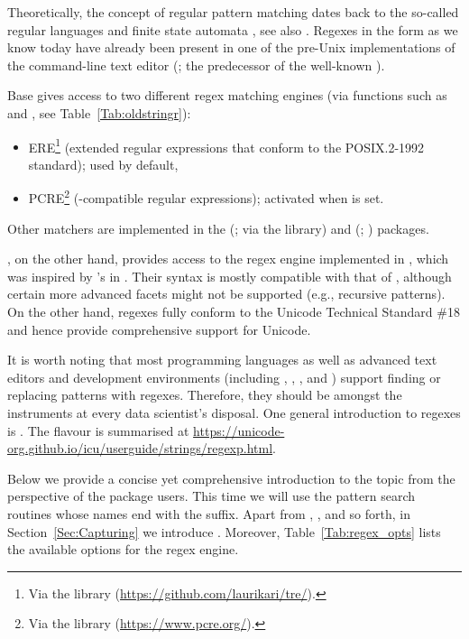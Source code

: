 \documentclass[nojss]{jss}\usepackage[]{graphicx}\usepackage[]{xcolor}
\begin{document}
Theoretically, the concept of regular pattern matching
dates back to the so-called regular languages and finite state
automata \citep{kleene},
see also \citep{hopcroftullman,automata}.
Regexes in the form as we know today have already been present
in one of the pre-Unix implementations of the command-line text
editor  (\citealp{qed}; the predecessor of the well-known ).

Base   gives access to two different regex matching engines
(via functions such as  and ,
see Table~\ref{Tab:oldstringr}):
\begin{itemize}
\item {ERE}\footnote{Via the  library
(\url{https://github.com/laurikari/tre/}).}
(extended regular expressions that conform
to the POSIX.2-1992 standard);
used by default,
\item {PCRE}\footnote{Via the 
library (\url{https://www.pcre.org/}).}
(-compatible regular expressions);
activated when  is set.
\end{itemize}
Other matchers are implemented in the 
(\citealp{ore}; via the  library)
and  (\citealp{re2r}; ) packages.


, on the other hand, provides access to the regex engine
implemented in , which was inspired
by 's 
in . Their syntax is mostly compatible with that of ,
although certain more advanced facets might not be supported (e.g., recursive
patterns). On the other hand,  regexes fully conform to the
Unicode Technical Standard \#18 \citep{uts18:regex} and hence provide
comprehensive support for Unicode.


It is worth noting that most programming languages
as well as advanced text editors and development environments (including
, , , and )
support finding or replacing patterns with regexes.
Therefore, they should be amongst the instruments
at every data scientist's disposal.
One general introduction to regexes is \citep{friedl}.
The  flavour is summarised at
\url{https://unicode-org.github.io/icu/userguide/strings/regexp.html}.






Below we provide a concise yet comprehensive introduction
to the topic from the perspective of the  package users.
This time we will use the pattern search routines whose names
end with the  suffix.
Apart from , ,
and so forth, in Section~\ref{Sec:Capturing} we introduce
.
Moreover, Table~\ref{Tab:regex_opts} lists the available options
for the regex engine.
\end{document}
